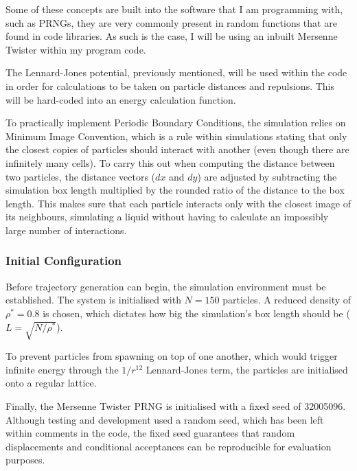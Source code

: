 \documentclass[11pt,a4paper]{article}
\begin{document}
            Some of these concepts are built into the software that I am programming with, such as PRNGs, they are very commonly present in random functions that are found in code libraries.
            As such is the case, I will be using an inbuilt Mersenne Twister within my program code.
            
            The Lennard-Jones potential, previously mentioned, will be used within the code in order for calculations to be taken on particle distances and repulsions.
            This will be hard-coded into an energy calculation function.
            
            To practically implement Periodic Boundary Conditions, the simulation relies on Minimum Image Convention, which is a rule within simulations stating that only the closest copies of particles should interact with another (even though there are infinitely many cells).
            To carry this out when computing the distance between two particles, the distance vectors ($dx$ and $dy$) are adjusted by subtracting the simulation box length multiplied by the rounded ratio of the distance to the box length.
            This makes sure that each particle interacts only with the closest image of its neighbours, simulating a liquid without having to calculate an impossibly large number of interactions.

        \subsubsection{Initial Configuration}
            Before trajectory generation can begin, the simulation environment must be established.
            The system is initialised with $N = 150$ particles.
            A reduced density of $\rho^* = 0.8$ is chosen, which dictates how big the simulation's box length should be ($L = \sqrt{N/\rho^*}$). 
            
            To prevent particles from spawning on top of one another, which would trigger infinite energy through the $1/r^{12}$ Lennard-Jones term, the particles are initialised onto a regular lattice.
            
            Finally, the Mersenne Twister PRNG is initialised with a fixed seed of 32005096.
            Although testing and development used a random seed, which has been left within comments in the code, the fixed seed guarantees that random displacements and conditional acceptances can be reproducible for evaluation purposes.
        
\end{document}
